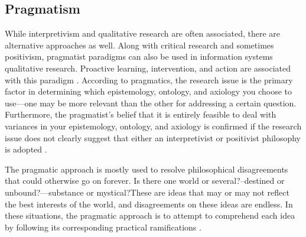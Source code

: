{{\subsection{Pragmatism}
\par{While interpretivism and qualitative research are often associated, there are alternative approaches as well. Along with critical research and sometimes positivism, pragmatist paradigms can also be used in information systems qualitative research. Proactive learning, intervention, and action are associated with this paradigm \citep{goldkuhl2012pragmatism}. According to pragmatics, the research issue is the primary factor in determining which epistemology, ontology, and axiology you choose to use—one may be more relevant than the other for addressing a certain question. Furthermore, the pragmatist's belief that it is entirely feasible to deal with variances in your epistemology, ontology, and axiology is confirmed if the research issue does not clearly suggest that either an interpretivist or positivist philosophy is adopted \citep{saunders2003research}.}
\par{The pragmatic approach is mostly used to resolve philosophical disagreements that could otherwise go on forever. Is there one world or several?--destined or unbound?—substance or mystical?These are ideas that may or may not reflect the best interests of the world, and disagreements on these ideas are endless. In these situations, the pragmatic approach is to attempt to comprehend each idea by following its corresponding practical ramifications \citep{james2020pragmatism}.}
}}
